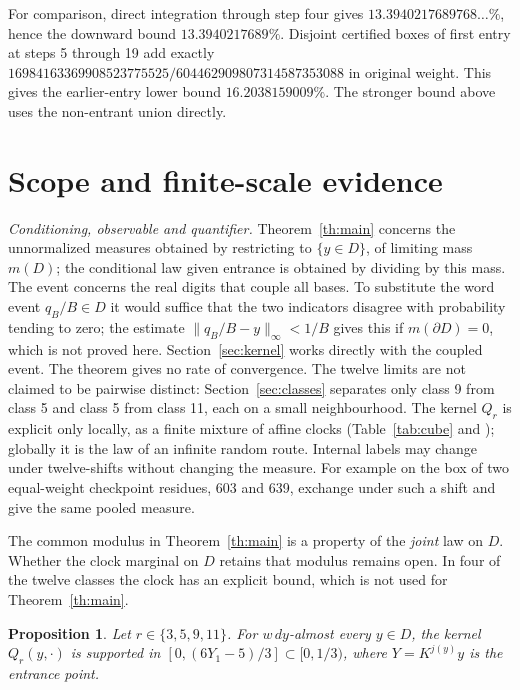 \documentclass[11pt,reqno]{amsart}
\newtheorem{proposition}[theorem]{Proposition}
\theoremstyle{definition}
\begin{document}
For comparison, direct integration through step four gives
\(13.3940217689768\ldots\%\), hence the downward bound
\(13.3940217689\%\). Disjoint certified boxes of first entry
at steps 5 through 19 add exactly
\(16984163369908523775525/604462909807314587353088\) in
original weight. This gives the earlier-entry lower bound
\(16.2038159009\%\). The stronger bound above uses the
non-entrant union directly.

\section{Scope and finite-scale evidence}\label{sec:scope}

\emph{Conditioning, observable and quantifier.} Theorem~\ref{th:main}
concerns the unnormalized measures obtained by restricting to
\(\{y\in D\}\), of limiting mass \(m(D)\); the conditional law given
entrance is obtained by dividing by this mass. The event concerns the
real digits that couple all bases. To substitute the word event
\(q_B/B\in D\) it would suffice that the two indicators disagree with
probability tending to zero; the estimate \(\|q_B/B-y\|_\infty<1/B\) gives
this if \(m(\partial D)=0\), which is not proved here.
Section~\ref{sec:kernel} works directly with the coupled event. The theorem gives no rate of convergence. The twelve
limits are not claimed to be pairwise distinct: Section~\ref{sec:classes}
separates only class 9 from class 5 and class 5 from class 11, each on a
small neighbourhood. The kernel \(Q_r\) is explicit only locally, as a
finite mixture of affine clocks (Table~\ref{tab:cube} and
\cite[Table~2]{G7}); globally it is the law of an infinite random route.
Internal labels may change under twelve-shifts without changing the
measure. For example on the box of \cite{G7} two equal-weight checkpoint
residues, 603 and 639, exchange under such a shift and give the same
pooled measure.

The common modulus in Theorem~\ref{th:main} is a property of the
\emph{joint} law on \(D\). Whether the clock marginal on \(D\)
retains that modulus remains open. In four of the twelve classes the
clock has an explicit bound, which is not used for
Theorem~\ref{th:main}.

\begin{proposition}\label{prop:fourlift}
Let \(r\in\{3,5,9,11\}\). For \(w\,dy\)-almost every \(y\in D\), the
kernel \(Q_r(y,\cdot)\) is supported in \([0,(6Y_1-5)/3]\subset[0,1/3)\),
where \(Y=K^{j(y)}y\) is the entrance point.
\end{proposition}
\end{document}
